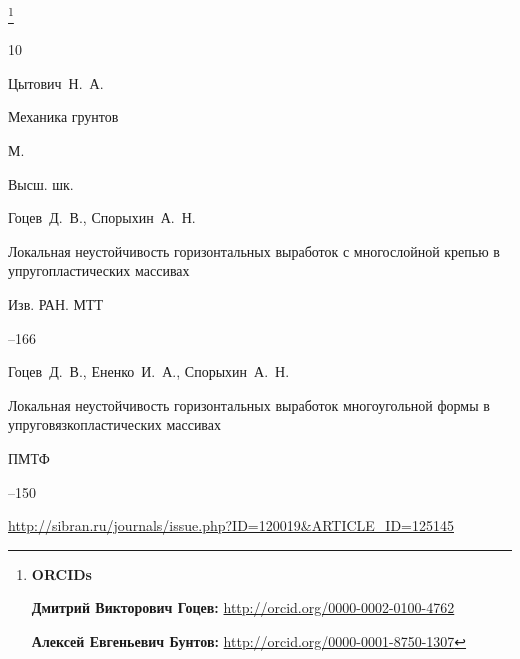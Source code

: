 \thanks{{\bf ORCIDs}



{\bf Дмитрий Викторович Гоцев:}   \url{http://orcid.org/0000-0002-0100-4762}



{\bf Алексей Евгеньевич Бунтов:}  \url{http://orcid.org/0000-0001-8750-1307}



}





\RusRef

\begin{thebibliography}{10}




\by Цытович~Н.~А.

\book Механика грунтов

\publaddr М.

\publ Высш. шк.






\by Гоцев~Д.~В., Спорыхин~А.~Н.

\paper Локальная неустойчивость горизонтальных выработок с многослойной крепью в упругопластических массивах

\jour Изв. РАН. МТТ




--166





\by Гоцев~Д.~В., Ененко~И.~А., Спорыхин~А.~Н.

\paper Локальная неустойчивость горизонтальных выработок многоугольной формы в упруговязкопластических массивах

\jour ПМТФ




--150

\elink \url{http://sibran.ru/journals/issue.php?ID=120019&ARTICLE_ID=125145}


\end{thebibliography}
